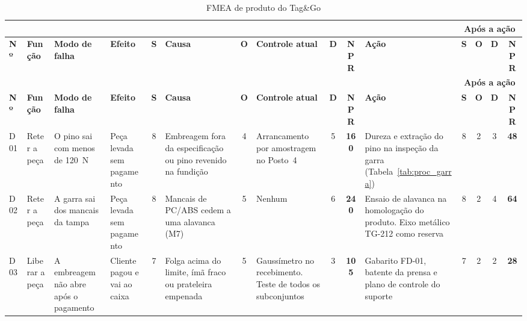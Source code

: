 \begin{landscape}
\begingroup
\scriptsize
\setlength{\tabcolsep}{3pt}
\renewcommand{\arraystretch}{1.2}
\begin{longtable}{@{}
    >{\RaggedRight\arraybackslash}p{0.6cm}
    >{\RaggedRight\arraybackslash}p{2.0cm}
    >{\RaggedRight\arraybackslash}p{2.6cm}
    >{\RaggedRight\arraybackslash}p{2.4cm}
    c
    >{\RaggedRight\arraybackslash}p{3.0cm}
    c
    >{\RaggedRight\arraybackslash}p{2.6cm}
    c c
    >{\RaggedRight\arraybackslash}p{4.6cm}
    c c c c@{}}
    \caption{FMEA de produto do Tag\&Go}\label{tab:fmea_produto}\\
    \toprule
    & & & & & & & & & & & \multicolumn{4}{c}{\textbf{Após a ação}} \\
    \cmidrule(l){12-15}
    \textbf{Nº} & \textbf{Função} & \textbf{Modo de falha} & \textbf{Efeito} & \textbf{S} & \textbf{Causa} & \textbf{O} & \textbf{Controle atual} & \textbf{D} & \textbf{NPR} & \textbf{Ação} & \textbf{S} & \textbf{O} & \textbf{D} & \textbf{NPR} \\
    \midrule
    \endfirsthead
    \toprule
    & & & & & & & & & & & \multicolumn{4}{c}{\textbf{Após a ação}} \\
    \cmidrule(l){12-15}
    \textbf{Nº} & \textbf{Função} & \textbf{Modo de falha} & \textbf{Efeito} & \textbf{S} & \textbf{Causa} & \textbf{O} & \textbf{Controle atual} & \textbf{D} & \textbf{NPR} & \textbf{Ação} & \textbf{S} & \textbf{O} & \textbf{D} & \textbf{NPR} \\
    \midrule
    \endhead
    \bottomrule
    \endfoot
    D01 & Reter a peça & O pino sai com menos de 120~N & Peça levada sem pagamento & 8 & Embreagem fora da especificação ou pino revenido na fundição & 4 & Arrancamento por amostragem no Posto~4 & 5 & \textbf{160} & Dureza e extração do pino na inspeção da garra (Tabela~\ref{tab:proc_garra}) & 8 & 2 & 3 & \textbf{48} \\
    \addlinespace
    D02 & Reter a peça & A garra sai dos mancais da tampa & Peça levada sem pagamento & 8 & Mancais de PC/ABS cedem a uma alavanca (M7) & 5 & Nenhum & 6 & \textbf{240} & Ensaio de alavanca na homologação do produto. Eixo metálico TG-212 como reserva & 8 & 2 & 4 & \textbf{64} \\
    \addlinespace
    D03 & Liberar a peça & A embreagem não abre após o pagamento & Cliente pagou e vai ao caixa & 7 & Folga acima do limite, ímã fraco ou prateleira empenada & 5 & Gaussímetro no recebimento. Teste de todos os subconjuntos & 3 & \textbf{105} & Gabarito FD-01, batente da prensa e plano de controle do suporte & 7 & 2 & 2 & \textbf{28} \\

\end{longtable}
\end{landscape}
